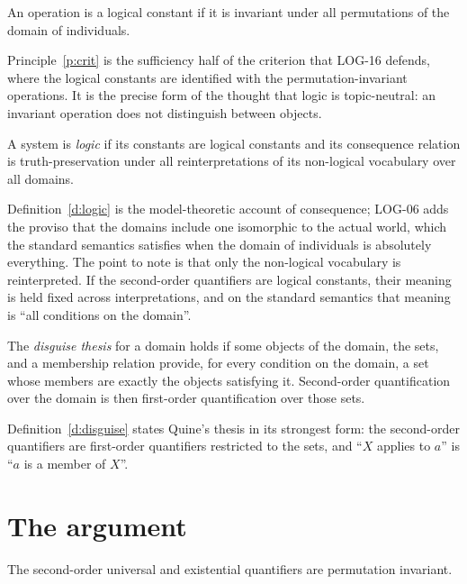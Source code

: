 \documentclass{situationist-preprint}
\begin{document}
\begin{principle}\label{p:crit}
An operation is a logical constant if it is invariant under all permutations of the domain of individuals.
\end{principle}

Principle~\ref{p:crit} is the sufficiency half of the criterion that LOG-16 defends, where the logical constants are identified with the permutation-invariant operations. It is the precise form of the thought that logic is topic-neutral: an invariant operation does not distinguish between objects.

\begin{definition}\label{d:logic}
A system is \emph{logic} if its constants are logical constants and its consequence relation is truth-preservation under all reinterpretations of its non-logical vocabulary over all domains.
\end{definition}

Definition~\ref{d:logic} is the model-theoretic account of consequence; LOG-06 adds the proviso that the domains include one isomorphic to the actual world, which the standard semantics satisfies when the domain of individuals is absolutely everything. The point to note is that only the non-logical vocabulary is reinterpreted. If the second-order quantifiers are logical constants, their meaning is held fixed across interpretations, and on the standard semantics that meaning is \enquote{all conditions on the domain}.

\begin{definition}\label{d:disguise}
The \emph{disguise thesis} for a domain holds if some objects of the domain, the sets, and a membership relation provide, for every condition on the domain, a set whose members are exactly the objects satisfying it. Second-order quantification over the domain is then first-order quantification over those sets.
\end{definition}

Definition~\ref{d:disguise} states Quine's thesis in its strongest form: the second-order quantifiers are first-order quantifiers restricted to the sets, and \enquote{$X$ applies to $a$} is \enquote{$a$ is a member of $X$}.

\section{The argument}\label{s:arg}

\begin{theorem}\label{t:inv}
The second-order universal and existential quantifiers are permutation invariant.
\end{theorem}
\end{document}
